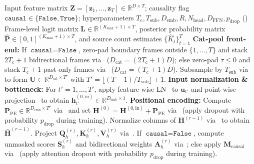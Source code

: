 \documentclass[lettersize,journal]{IEEEtran}
\begin{document}
\begin{algorithm}[t]
  \caption{Unified Single-Stream Transformer Forward Pass (Baseline and Strictly Causal Modes)}
  \label{alg:causal_transformer}
  \begin{algorithmic}[1]
    \REQUIRE Input feature matrix $\mathbf{Z} = [\mathbf{z}_1, \dots, \mathbf{z}_T] \in \mathbb{R}^{D \times T}$; causality flag $\texttt{causal} \in \{\texttt{False}, \texttt{True}\}$; hyperparameters $T_{\mathrm{c}}, T_{\mathrm{sub}}, D_{\mathrm{emb}}, R, N_{\mathrm{head}}, D_{\mathrm{FFN}}, p_{\mathrm{drop}}$ ()
    \ENSURE Frame-level logit matrix $\mathbf{L} \in \mathbb{R}^{(K_{\mathrm{max}}+1) \times T}$, posterior probability matrix $\widehat{\mathbf{P}} \in [0, 1]^{(K_{\mathrm{max}}+1) \times T}$, and source count estimates $\{\widehat{K}_t\}_{t=1}^{T}$
    \STATE \textbf{Cat-pool front-end:} If $\texttt{causal} = \texttt{False}$, zero-pad boundary frames outside $\{1, \dots, T\}$ and stack $2T_{\mathrm{c}}+1$ bidirectional frames via~ ($D_{\mathrm{cat}} = (2T_{\mathrm{c}}+1)D$); else zero-pad $\tau \le 0$ and stack $T_{\mathrm{c}}+1$ past-only frames via~ ($D_{\mathrm{cat}} = (T_{\mathrm{c}}+1)D$). Subsample by $T_{\mathrm{sub}}$ via~ to form $\mathbf{U} \in \mathbb{R}^{D_{\mathrm{cat}} \times T'}$ with $T' = \lfloor (T - 1) / T_{\mathrm{sub}} \rfloor + 1$.
    \STATE \textbf{Input normalization \& bottleneck:} For $t' = 1, \dots, T'$, apply feature-wise \acrshort{LN}~ to $\mathbf{u}_{t'}$ and point-wise projection~ to obtain $\mathbf{h}_{t'}^{(0,\mathrm{in})} \in \mathbb{R}^{D_{\mathrm{emb}} \times 1}$.
    \STATE \textbf{Positional encoding:} Compute $\mathbf{P}_{\mathrm{PE}} \in \mathbb{R}^{D_{\mathrm{emb}} \times T'}$ via~ and set $\mathbf{H}^{(0)} = \mathbf{H}^{(0,\mathrm{in})} + \mathbf{P}_{\mathrm{PE}}$ via~ (apply dropout with probability $p_{\mathrm{drop}}$ during training).
      \STATE Normalize columns of $\mathbf{H}^{(r-1)}$ via~ to obtain $\bar{\mathbf{H}}^{(r-1)}$.
        \STATE Project $\mathbf{Q}_h^{(r)}, \mathbf{K}_h^{(r)}, \mathbf{V}_h^{(r)}$ via~.
        \STATE If $\texttt{causal} = \texttt{False}$, compute unmasked scores $\mathbf{S}_h^{(r)}$ and bidirectional weights $\mathbf{A}_h^{(r)}$ via~; else apply $\mathbf{M}_{\mathrm{causal}}$ via~ (apply attention dropout with probability $p_{\mathrm{drop}}$ during training).

\end{algorithmic}
\end{algorithm}
\end{document}
